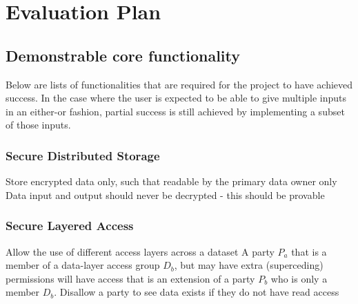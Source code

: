 \section{Evaluation Plan}




\subsection{Demonstrable core functionality}

Below are lists of functionalities that are required for the project to have achieved success. In the case where the user is expected to be able to give multiple inputs in an either-or fashion, partial success is still achieved by implementing a subset of those inputs.

\subsubsection{Secure Distributed Storage}

\begin{outline}
  \1 Store encrypted data only, such that readable by the primary data owner only
  \1 Data input and output should never be decrypted - this should be provable
\end{outline}

\subsubsection{Secure Layered Access}

\begin{outline}
  \1 Allow the use of different access layers across a dataset
  \1 A party $P_a$ that is a member of a data-layer access group $D_b$, but may have extra (superceding) permissions will have access that is an extension of a party $P_b$ who is only a member $D_b$.
  \1 Disallow a party to see data exists if they do not have read access
\end{outline}

